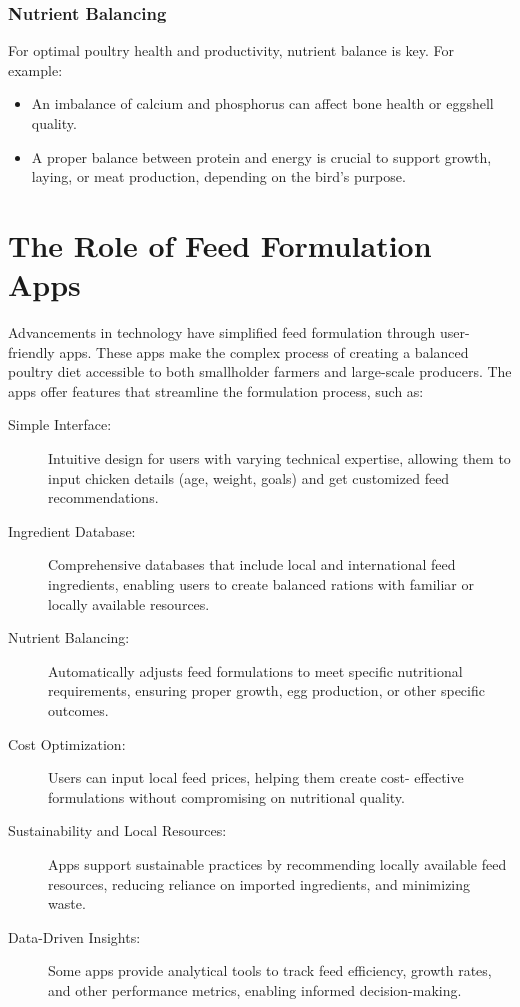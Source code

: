 \documentclass[a4paper,12pt]{article}
\begin{document}
\subsubsection{Nutrient Balancing}
For optimal poultry health and productivity, nutrient balance is key. For example:

\begin{itemize}
	\item An imbalance of calcium and phosphorus can affect bone health or eggshell
quality.
	\item A proper balance between protein and energy is crucial to support growth,
laying, or meat production, depending on the bird's purpose.
\end{itemize}

\newpage
\section{The Role of Feed Formulation Apps}
Advancements in technology have simplified feed formulation through user-friendly
apps. These apps make the complex process of creating a balanced poultry diet
accessible to both smallholder farmers and large-scale producers. The apps offer
features that streamline the formulation process, such as:

\begin{description}
	\item[Simple Interface:] Intuitive design for users with varying technical expertise,
allowing them to input chicken details (age, weight, goals) and get customized
feed recommendations.
	\item[Ingredient Database:] Comprehensive databases that include local and
international feed ingredients, enabling users to create balanced rations with
familiar or locally available resources.
	\item[Nutrient Balancing:] Automatically adjusts feed formulations to meet specific
nutritional requirements, ensuring proper growth, egg production, or other
specific outcomes.
	\item[Cost Optimization:] Users can input local feed prices, helping them create cost-
effective formulations without compromising on nutritional quality.
	\item[Sustainability and Local Resources:] Apps support sustainable practices by
recommending locally available feed resources, reducing reliance on imported
ingredients, and minimizing waste.
	\item[Data-Driven Insights:] Some apps provide analytical tools to track feed
efficiency, growth rates, and other performance metrics, enabling informed
decision-making.
\end{description}
\end{document}
